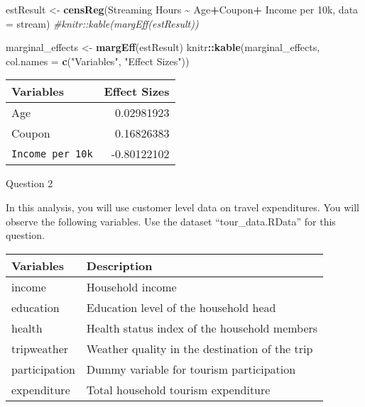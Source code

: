 \documentclass[
]{article}
\newenvironment{Shaded}{\begin{snugshade}}{\end{snugshade}}
\newcommand{\AttributeTok}[1]{\textcolor[rgb]{0.13,0.29,0.53}{#1}}
\newcommand{\CommentTok}[1]{\textcolor[rgb]{0.56,0.35,0.01}{\textit{#1}}}
\newcommand{\FunctionTok}[1]{\textcolor[rgb]{0.13,0.29,0.53}{\textbf{#1}}}
\newcommand{\NormalTok}[1]{#1}
\newcommand{\OtherTok}[1]{\textcolor[rgb]{0.56,0.35,0.01}{#1}}
\newcommand{\SpecialCharTok}[1]{\textcolor[rgb]{0.81,0.36,0.00}{\textbf{#1}}}
\newcommand{\StringTok}[1]{\textcolor[rgb]{0.31,0.60,0.02}{#1}}
\begin{document}
\begin{Shaded}
\begin{Highlighting}[]
\NormalTok{estResult }\OtherTok{\textless{}{-}} \FunctionTok{censReg}\NormalTok{(}\StringTok{\textasciigrave{}}\AttributeTok{Streaming Hours}\StringTok{\textasciigrave{}} \SpecialCharTok{\textasciitilde{}}\NormalTok{ Age}\SpecialCharTok{+}\NormalTok{Coupon}\SpecialCharTok{+} \StringTok{\textasciigrave{}}\AttributeTok{Income per 10k}\StringTok{\textasciigrave{}}\NormalTok{, }\AttributeTok{data =}\NormalTok{ stream)}
\CommentTok{\#knitr::kable(margEff(estResult))}


\NormalTok{marginal\_effects }\OtherTok{\textless{}{-}} \FunctionTok{margEff}\NormalTok{(estResult)}
\NormalTok{knitr}\SpecialCharTok{::}\FunctionTok{kable}\NormalTok{(marginal\_effects, }\AttributeTok{col.names =} \FunctionTok{c}\NormalTok{(}\StringTok{"Variables"}\NormalTok{, }\StringTok{"Effect Sizes"}\NormalTok{))}
\end{Highlighting}
\end{Shaded}

\begin{longtable}[]{@{}lr@{}}
\toprule\noalign{}
Variables & Effect Sizes \\
\midrule\noalign{}
\endhead
\bottomrule\noalign{}
\endlastfoot
Age & 0.02981923 \\
Coupon & 0.16826383 \\
\texttt{Income\ per\ 10k} & -0.80122102 \\
\end{longtable}

Question 2

In this analysis, you will use customer level data on travel
expenditures. You will observe the following variables. Use the dataset
``tour\_data.RData'' for this question.

\begin{longtable}[]{@{}ll@{}}
\toprule\noalign{}
Variables & Description \\
\midrule\noalign{}
\endhead
\bottomrule\noalign{}
\endlastfoot
income & Household income \\
education & Education level of the household head \\
health & Health status index of the household members \\
tripweather & Weather quality in the destination of the trip \\
participation & Dummy variable for tourism participation \\
expenditure & Total household tourism expenditure \\
\end{longtable}
\end{document}
